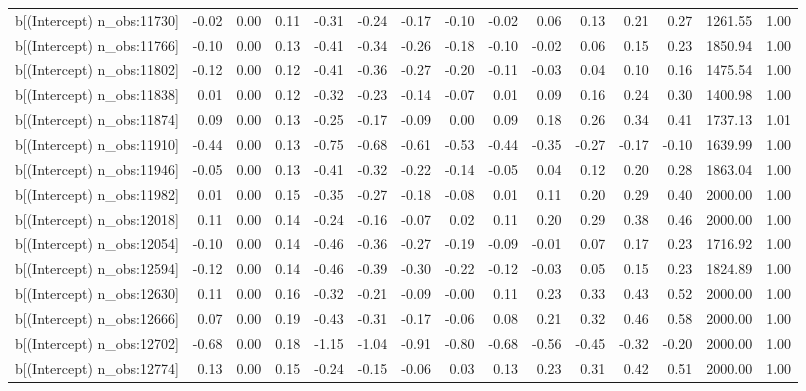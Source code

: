 \begin{table}[ht]
\begin{tabular}{rrrrrrrrrrrrrrr}
  b[(Intercept) n\_obs:11730] & -0.02 & 0.00 & 0.11 & -0.31 & -0.24 & -0.17 & -0.10 & -0.02 & 0.06 & 0.13 & 0.21 & 0.27 & 1261.55 & 1.00 \\ 
  b[(Intercept) n\_obs:11766] & -0.10 & 0.00 & 0.13 & -0.41 & -0.34 & -0.26 & -0.18 & -0.10 & -0.02 & 0.06 & 0.15 & 0.23 & 1850.94 & 1.00 \\ 
  b[(Intercept) n\_obs:11802] & -0.12 & 0.00 & 0.12 & -0.41 & -0.36 & -0.27 & -0.20 & -0.11 & -0.03 & 0.04 & 0.10 & 0.16 & 1475.54 & 1.00 \\ 
  b[(Intercept) n\_obs:11838] & 0.01 & 0.00 & 0.12 & -0.32 & -0.23 & -0.14 & -0.07 & 0.01 & 0.09 & 0.16 & 0.24 & 0.30 & 1400.98 & 1.00 \\ 
  b[(Intercept) n\_obs:11874] & 0.09 & 0.00 & 0.13 & -0.25 & -0.17 & -0.09 & 0.00 & 0.09 & 0.18 & 0.26 & 0.34 & 0.41 & 1737.13 & 1.01 \\ 
  b[(Intercept) n\_obs:11910] & -0.44 & 0.00 & 0.13 & -0.75 & -0.68 & -0.61 & -0.53 & -0.44 & -0.35 & -0.27 & -0.17 & -0.10 & 1639.99 & 1.00 \\ 
  b[(Intercept) n\_obs:11946] & -0.05 & 0.00 & 0.13 & -0.41 & -0.32 & -0.22 & -0.14 & -0.05 & 0.04 & 0.12 & 0.20 & 0.28 & 1863.04 & 1.00 \\ 
  b[(Intercept) n\_obs:11982] & 0.01 & 0.00 & 0.15 & -0.35 & -0.27 & -0.18 & -0.08 & 0.01 & 0.11 & 0.20 & 0.29 & 0.40 & 2000.00 & 1.00 \\ 
  b[(Intercept) n\_obs:12018] & 0.11 & 0.00 & 0.14 & -0.24 & -0.16 & -0.07 & 0.02 & 0.11 & 0.20 & 0.29 & 0.38 & 0.46 & 2000.00 & 1.00 \\ 
  b[(Intercept) n\_obs:12054] & -0.10 & 0.00 & 0.14 & -0.46 & -0.36 & -0.27 & -0.19 & -0.09 & -0.01 & 0.07 & 0.17 & 0.23 & 1716.92 & 1.00 \\ 
  b[(Intercept) n\_obs:12594] & -0.12 & 0.00 & 0.14 & -0.46 & -0.39 & -0.30 & -0.22 & -0.12 & -0.03 & 0.05 & 0.15 & 0.23 & 1824.89 & 1.00 \\ 
  b[(Intercept) n\_obs:12630] & 0.11 & 0.00 & 0.16 & -0.32 & -0.21 & -0.09 & -0.00 & 0.11 & 0.23 & 0.33 & 0.43 & 0.52 & 2000.00 & 1.00 \\ 
  b[(Intercept) n\_obs:12666] & 0.07 & 0.00 & 0.19 & -0.43 & -0.31 & -0.17 & -0.06 & 0.08 & 0.21 & 0.32 & 0.46 & 0.58 & 2000.00 & 1.00 \\ 
  b[(Intercept) n\_obs:12702] & -0.68 & 0.00 & 0.18 & -1.15 & -1.04 & -0.91 & -0.80 & -0.68 & -0.56 & -0.45 & -0.32 & -0.20 & 2000.00 & 1.00 \\ 
  b[(Intercept) n\_obs:12774] & 0.13 & 0.00 & 0.15 & -0.24 & -0.15 & -0.06 & 0.03 & 0.13 & 0.23 & 0.31 & 0.42 & 0.51 & 2000.00 & 1.00 \\ 

\end{tabular}
\end{table}
